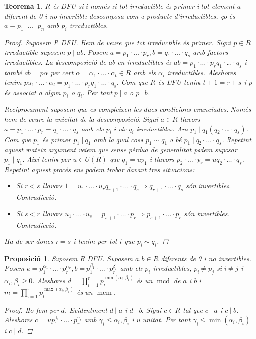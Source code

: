 \documentclass[a4paper,11pt]{report}
\newcommand{\puntets}{\cdot\ldots\cdot}
\DeclareMathOperator{\mcd}{mcd}
\DeclareMathOperator{\mcm}{mcm}
\newcommand{\im}{\Rightarrow}
\theoremstyle{theorem}
\newtheorem{proposicio}{\normalfont \sffamily\bfseries Proposició}[section]
\newtheorem{teorema}{\normalfont \sffamily\bfseries Teorema}[section]
\theoremstyle{definition}
\begin{document}
\begin{teorema}
	$R$ és DFU si i només si tot irreductible és primer i tot element $a$ diferent de 0 i no invertible descomposa com a producte d'irreductibles, ço és $a=p_1\cdot\ldots\cdot p_n$ amb $p_i$ irreductibles.
	\begin{proof}
		Suposem $R$ DFU. Hem de veure que tot irreductible és primer. Sigui $p\in R$ irreductible suposem $p\mid ab$. Posem $a=p_1\puntets p_r,b=q_1\puntets q_s$ amb factors irreductibles. La descomposició de $ab$ en irreductibles és $ab=p_1\puntets p_rq_1\puntets q_s$ i també $ab=p\alpha$ per cert $\alpha=\alpha_1\puntets\alpha_t\in R$ amb els $\alpha_i$ irreductibles. Aleshores tenim $p\alpha_1\puntets\alpha_t=p_1\puntets p_rq_1\puntets q_s$. Com que $R$ és DFU tenim $t+1=r+s$ i $p$ és associat a algun $p_i$ o $q_i$. Per tant $p\mid a$ o $p\mid b$.
		
		Recíprocament suposem que es compleixen les dues condicions enunciades. Només hem de veure la unicitat de la descomposició. Sigui $a\in R$ llavors $a=p_1\puntets p_r=q_1\puntets q_s$ amb els $p_i$ i els $q_i$ irreductibles. Ara $p_1\mid q_1(q_2\puntets q_s)$. Com que $p_1$ és primer $p_1\mid q_1$ amb la qual cosa $p_1\sim q_1$ o bé $p_1\mid q_2\puntets q_s $. Repetint aquest mateix argument veiem que sense pèrdua de generalitat podem suposar $p_1\mid q_1$. Així tenim per $u\in U(R)$ que $q_1=up_1$ i llavors $p_2\puntets p_r=uq_2\puntets q_s$. Repetint aquest procés ens podem trobar davant tres situacions:
		\begin{itemize}
			\item Si $r<s$ llavors $1=u_1\puntets u_rq_{r+1}\puntets q_s\im q_{r+1}\puntets q_s$  són invertibles. Contradicció.
			\item Si $s<r$ llavors $u_1\puntets u_s=p_{s+1}\puntets p_r\im p_{s+1}\puntets p_r$  són invertibles. Contradicció.
		\end{itemize}
	Ha de ser doncs $r=s$ i tenim per tot $i$ que $p_i\sim q_i$.
	\end{proof}
\end{teorema}
\begin{proposicio}
	\label{md}
	Suposem $R$ DFU. Suposem $a,b\in R$ diferents de 0 i no invertibles. Posem $a=p_1^{\alpha_1}\puntets p_r^{\alpha_r},b=p_1^{\beta_1}\puntets p_r^{\beta_r}$ amb els $p_i$ irreductibles, $p_i\neq p_j$ si $i\neq j$ i $\alpha_i,\beta_i\geq 0$. Aleshores $d=\prod_{i=1}^{r}p_i^{\min(\alpha_i,\beta_i)}$ és un $\mcd$ de $a$ i $b$ i $m=\prod_{i=1}^{r}p_i^{\max(\alpha_i,\beta_i)}$ és un $\mcm$.\begin{proof}
		Ho fem per $d$. Evidentment $d\mid a$ i $d\mid b$. Sigui $c\in R$ tal que $c\mid a$ i $c\mid b$. Aleshores $c=up_1^{\gamma_1}\puntets p_r^{\gamma_r}$ amb $\gamma_i\leq\alpha_i,\beta_i$ i $u$ unitat. Per tant $\gamma_i\leq\min(\alpha_i,\beta_i)$ i $c\mid d$.
	\end{proof}
\end{proposicio}
\end{document}
